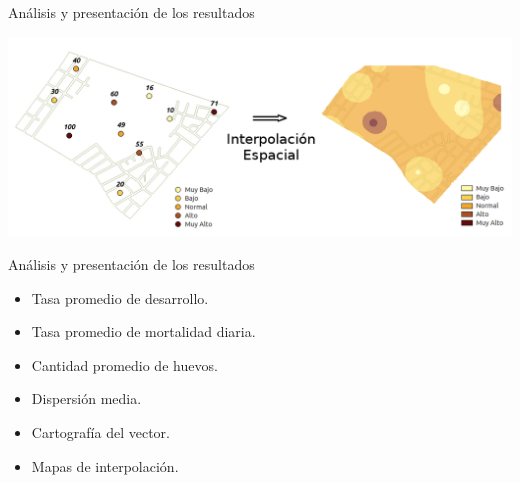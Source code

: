 \begin{frame}[c]{Análisis y presentación de los resultados}
  \begin{center}
      \includegraphics[width=\textwidth]{./graphics/identificacion-focos.png}
  \end{center}
\end{frame}


\begin{frame}[t]{Análisis y presentación de los resultados}
  \begin{center}
      \begin{itemize}
        \item Tasa promedio de desarrollo.
        \item Tasa promedio de mortalidad diaria.
        \item Cantidad promedio de huevos.
        \item Dispersión media.
        \item Cartografía del vector.
        \item Mapas de interpolación.
      \end{itemize}
  \end{center}
\end{frame}

